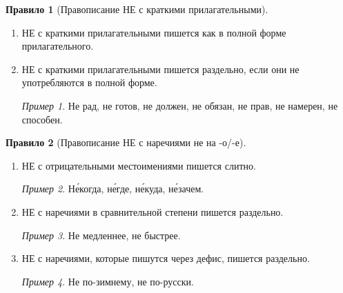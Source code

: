 \documentclass[12pt]{article}
\theoremstyle{definition}
\newtheorem{rrule}{Правило}[section]
\theoremstyle{remark}
\newtheorem*{example}{Пример}
\begin{document}
\begin{rrule}[Правописание НЕ с краткими прилагательными]
    \hfill
    \begin{enumerate}
        \item НЕ с краткими прилагательными пишется как в полной форме прилагательного.
        \item НЕ с краткими прилагательными пишется раздельно, если они не употребляются в полной форме.
        \begin{example}
            Не рад, не готов, не должен, не обязан, не прав, не намерен, не способен.
        \end{example}
    \end{enumerate}
\end{rrule}

\begin{rrule}[Правописание НЕ с наречиями не на -о/-е]
    \hfill
    \begin{enumerate}
        \item НЕ с отрицательными местоимениями пишется слитно.
        \begin{example}
            Н\'{е}когда, н\'{е}где, н\'{е}куда, н\'{е}зачем.
        \end{example}
        \item НЕ с наречиями в сравнительной степени пишется раздельно.
        \begin{example}
            Не медленнее, не быстрее.
        \end{example}
        \item НЕ с наречиями, которые пишутся через дефис, пишется раздельно.
        \begin{example}
            Не по-зимнему, не по-русски.
        \end{example}
    \end{enumerate}
\end{rrule}
\end{document}
